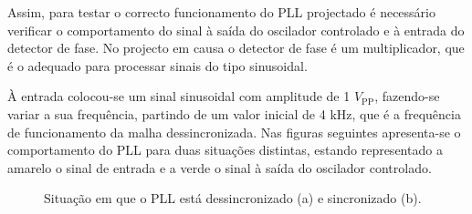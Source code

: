 \documentclass[11pt]{article}
\numberwithin{equation}{section}
\begin{document}
Assim, para testar o correcto funcionamento do PLL projectado é necessário verificar o comportamento do sinal à saída do oscilador controlado e à entrada do detector de fase. No projecto em causa o detector de fase é um multiplicador, que é o adequado para processar sinais do tipo sinusoidal. 

À entrada colocou-se um sinal sinusoidal com amplitude de 1 $V_{\text{PP}}$, fazendo-se variar a sua frequência, partindo de um valor inicial de 4 kHz, que é a frequência de funcionamento da malha dessincronizada. Nas figuras seguintes apresenta-se o comportamento do PLL para duas situações distintas, estando representado a amarelo o sinal de entrada e a verde o sinal à saída do oscilador controlado.

\begin{figure}[H]
	\centering
	\hspace{8mm}
	\vspace{-0.8em}
	\caption{Situação em que o PLL está dessincronizado (a) e sincronizado (b).}
	\label{fig:PLL}
	\vspace{-0.8em}
\end{figure}
\end{document}
